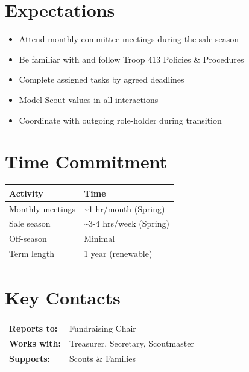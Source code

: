 \documentclass[11pt, letterpaper]{article}
\begin{document}
\hfill
\begin{minipage}[t]{0.48\linewidth}
\raggedright

\section{Expectations}
\begin{itemize}
  \item Attend monthly committee meetings during the sale season
  \item Be familiar with and follow Troop 413 Policies \& Procedures
  \item Complete assigned tasks by agreed deadlines
  \item Model Scout values in all interactions
  \item Coordinate with outgoing role-holder during transition
\end{itemize}

\section{Time Commitment}
\begin{tabular}{@{}p{3.0cm} p{3.8cm}@{}}
  \toprule
  \textbf{Activity} & \textbf{Time} \\
  \midrule
  Monthly meetings  & \textasciitilde{}1 hr/month (Spring) \\
  Sale season       & \textasciitilde{}3-4 hrs/week (Spring) \\
  Off-season        & Minimal \\
  Term length       & 1 year (renewable) \\
  \bottomrule
\end{tabular}

\vspace{1em}

\section{Key Contacts}
\begin{tabular}{@{}p{2.6cm} >{\raggedright\arraybackslash}p{4.2cm}@{}}
  \textbf{Reports to:}  & Fundraising Chair \\
  \textbf{Works with:}  & Treasurer, Secretary, Scoutmaster \\
  \textbf{Supports:}    & Scouts \& Families \\
\end{tabular}

\end{minipage}
\end{document}
